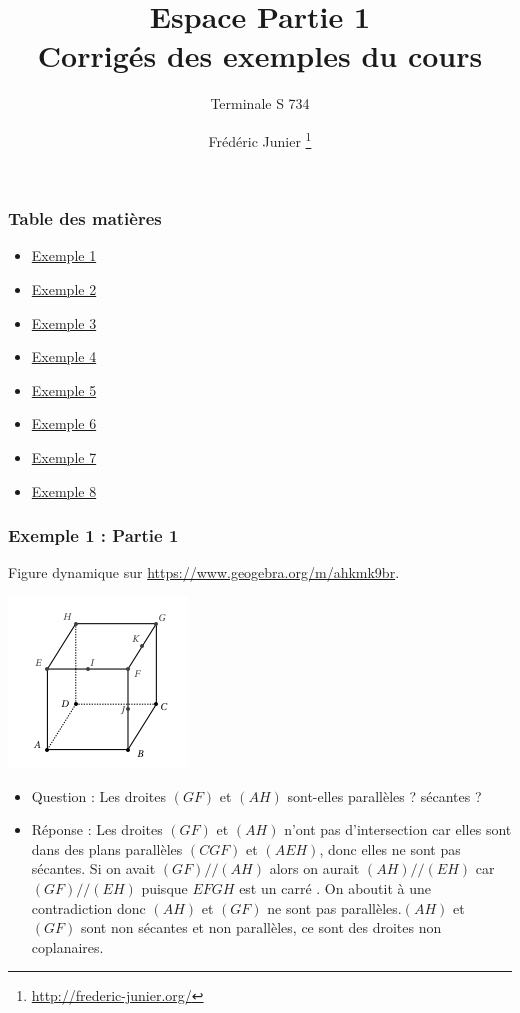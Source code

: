 \documentclass[xcolor=svgnames,t,final]{beamer}
\title{Espace Partie 1 \\ Corrigés des exemples du cours}\subtitle{Terminale S 734}
\author[]{Frédéric Junier \thanks{\url{http://frederic-junier.org/} }}
\institute[Lycée du Parc]{Lycée du Parc, Lyon}
\date[]{}
\begin{document}
\frame{\titlepage}


\begin{frame}
\frametitle{Table des matières}
\begin{itemize}
	\item \hyperlink{exemple1}{Exemple 1}
	\item \hyperlink{exemple2}{Exemple 2}
	\item \hyperlink{exemple3}{Exemple 3}
	\item \hyperlink{exemple4}{Exemple 4}
	\item \hyperlink{exemple5}{Exemple 5}
	\item \hyperlink{exemple6}{Exemple 6}
		\item \hyperlink{exemple7}{Exemple 7}
			\item \hyperlink{exemple8}{Exemple 8}
	
\end{itemize}

\end{frame}
 

 
\begin{frame}
\label{exemple1}
\frametitle{Exemple 1 : Partie 1}

Figure dynamique sur \href{https://www.geogebra.org/m/ahkmk9br}{https://www.geogebra.org/m/ahkmk9br}.


\begin{center}
\includegraphics[scale=0.4]{images/exemple1.png}
\end{center}

\begin{itemize}
\pause \item {\color{blue} Question : Les droites $(GF)$ et $(AH)$ sont-elles
   parallèles ? sécantes ? }
\pause \item {\color{red} Réponse : Les droites $(GF)$ et $(AH)$ n'ont pas d'intersection car elles sont dans des plans parallèles $(CGF)$ et $(AEH) $, donc elles ne sont pas sécantes.  Si on avait $(GF)//(AH)$ alors on aurait $(AH)//(EH)$ car $(GF)//(EH)$ puisque $EFGH$ est un carré . On aboutit à une contradiction donc $(AH)$ et $(GF)$ ne sont pas parallèles.$(AH)$ et $(GF)$ sont non sécantes et non parallèles, ce sont des droites non coplanaires.  }
\end{itemize}


\end{frame}
\end{document}
